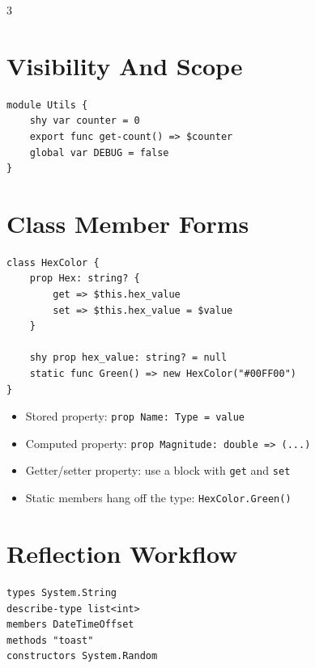 \begin{multicols*}{3}

\section{Visibility And Scope}
\begin{lstlisting}
module Utils {
    shy var counter = 0
    export func get-count() => $counter
    global var DEBUG = false
}
\end{lstlisting}


\section{Class Member Forms}
\begin{lstlisting}
class HexColor {
    prop Hex: string? {
        get => $this.hex_value
        set => $this.hex_value = $value
    }

    shy prop hex_value: string? = null
    static func Green() => new HexColor("#00FF00")
}
\end{lstlisting}

\begin{itemize}
\item Stored property: \texttt{prop Name: Type = value}
\item Computed property: \texttt{prop Magnitude: double => (...)}
\item Getter/setter property: use a block with \texttt{get} and \texttt{set}
\item Static members hang off the type: \texttt{HexColor.Green()}
\end{itemize}

\section{Reflection Workflow}
\begin{lstlisting}
types System.String
describe-type list<int>
members DateTimeOffset
methods "toast"
constructors System.Random
\end{lstlisting}


\end{multicols*}
